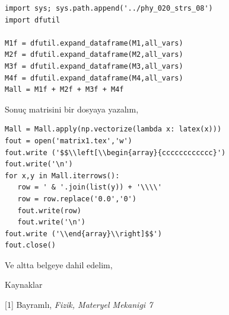 \documentclass[12pt,fleqn]{article}\usepackage{../../common}
\begin{document}
\begin{verbatim}
import sys; sys.path.append('../phy_020_strs_08')
import dfutil

M1f = dfutil.expand_dataframe(M1,all_vars)
M2f = dfutil.expand_dataframe(M2,all_vars)
M3f = dfutil.expand_dataframe(M3,all_vars)
M4f = dfutil.expand_dataframe(M4,all_vars)
Mall = M1f + M2f + M3f + M4f
\end{verbatim}

Sonuç matrisini bir dosyaya yazalım, 

\begin{verbatim}
Mall = Mall.apply(np.vectorize(lambda x: latex(x)))
fout = open('matrix1.tex','w')
fout.write ('$$\\left[\\begin{array}{cccccccccccc}')
fout.write('\n')
for x,y in Mall.iterrows():
   row = ' & '.join(list(y)) + '\\\\'
   row = row.replace('0.0','0')
   fout.write(row)
   fout.write('\n')
fout.write ('\\end{array}\\right]$$')
fout.close()
\end{verbatim}

Ve altta belgeye dahil edelim,



Kaynaklar

[1] Bayramlı, {\em Fizik, Materyel Mekanigi 7}
\end{document}
